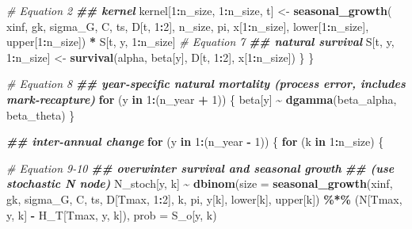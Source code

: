 \documentclass[
]{article}
\newenvironment{Shaded}{\begin{snugshade}}{\end{snugshade}}
\newcommand{\AttributeTok}[1]{\textcolor[rgb]{0.13,0.29,0.53}{#1}}
\newcommand{\CommentTok}[1]{\textcolor[rgb]{0.56,0.35,0.01}{\textit{#1}}}
\newcommand{\ControlFlowTok}[1]{\textcolor[rgb]{0.13,0.29,0.53}{\textbf{#1}}}
\newcommand{\DecValTok}[1]{\textcolor[rgb]{0.00,0.00,0.81}{#1}}
\newcommand{\DocumentationTok}[1]{\textcolor[rgb]{0.56,0.35,0.01}{\textbf{\textit{#1}}}}
\newcommand{\FunctionTok}[1]{\textcolor[rgb]{0.13,0.29,0.53}{\textbf{#1}}}
\newcommand{\NormalTok}[1]{#1}
\newcommand{\OtherTok}[1]{\textcolor[rgb]{0.56,0.35,0.01}{#1}}
\newcommand{\SpecialCharTok}[1]{\textcolor[rgb]{0.81,0.36,0.00}{\textbf{#1}}}
\begin{document}
\begin{Shaded}
\begin{Highlighting}[]
      \CommentTok{\# Equation 2}
      \DocumentationTok{\#\# kernel}
\NormalTok{      kernel[}\DecValTok{1}\SpecialCharTok{:}\NormalTok{n\_size, }\DecValTok{1}\SpecialCharTok{:}\NormalTok{n\_size, t] }\OtherTok{\textless{}{-}} \FunctionTok{seasonal\_growth}\NormalTok{(}
\NormalTok{        xinf, gk, sigma\_G, C, ts, D[t, }\DecValTok{1}\SpecialCharTok{:}\DecValTok{2}\NormalTok{], n\_size, pi, x[}\DecValTok{1}\SpecialCharTok{:}\NormalTok{n\_size], }
\NormalTok{        lower[}\DecValTok{1}\SpecialCharTok{:}\NormalTok{n\_size], upper[}\DecValTok{1}\SpecialCharTok{:}\NormalTok{n\_size]) }\SpecialCharTok{*}\NormalTok{ S[t, y, }\DecValTok{1}\SpecialCharTok{:}\NormalTok{n\_size]}
      \CommentTok{\# Equation 7}
      \DocumentationTok{\#\# natural survival}
\NormalTok{      S[t, y, }\DecValTok{1}\SpecialCharTok{:}\NormalTok{n\_size] }\OtherTok{\textless{}{-}} \FunctionTok{survival}\NormalTok{(alpha, beta[y], D[t, }\DecValTok{1}\SpecialCharTok{:}\DecValTok{2}\NormalTok{], x[}\DecValTok{1}\SpecialCharTok{:}\NormalTok{n\_size])}
\NormalTok{    \}}
\NormalTok{  \}}
  
  \CommentTok{\# Equation 8}
  \DocumentationTok{\#\# year{-}specific natural mortality (process error, includes mark{-}recapture)}
  \ControlFlowTok{for}\NormalTok{ (y }\ControlFlowTok{in} \DecValTok{1}\SpecialCharTok{:}\NormalTok{(n\_year }\SpecialCharTok{+} \DecValTok{1}\NormalTok{)) \{}
\NormalTok{    beta[y] }\SpecialCharTok{\textasciitilde{}} \FunctionTok{dgamma}\NormalTok{(beta\_alpha, beta\_theta)}
\NormalTok{  \}}
  
  \DocumentationTok{\#\# inter{-}annual change}
  \ControlFlowTok{for}\NormalTok{ (y }\ControlFlowTok{in} \DecValTok{1}\SpecialCharTok{:}\NormalTok{(n\_year }\SpecialCharTok{{-}} \DecValTok{1}\NormalTok{)) \{}
    \ControlFlowTok{for}\NormalTok{ (k }\ControlFlowTok{in} \DecValTok{1}\SpecialCharTok{:}\NormalTok{n\_size) \{}
      
      \CommentTok{\# Equation 9{-}10}
      \DocumentationTok{\#\# overwinter survival and seasonal growth}
      \DocumentationTok{\#\# (use stochastic N node)}
\NormalTok{      N\_stoch[y, k] }\SpecialCharTok{\textasciitilde{}} \FunctionTok{dbinom}\NormalTok{(}\AttributeTok{size =} \FunctionTok{seasonal\_growth}\NormalTok{(xinf, gk, sigma\_G, C, ts, }
\NormalTok{                                                    D[Tmax, }\DecValTok{1}\SpecialCharTok{:}\DecValTok{2}\NormalTok{], k, pi, y[k], }
\NormalTok{                                                    lower[k], upper[k]) }\SpecialCharTok{\%*\%} 
\NormalTok{                               (N[Tmax, y, k] }\SpecialCharTok{{-}}\NormalTok{ H\_T[Tmax, y, k]),}
                             \AttributeTok{prob =}\NormalTok{ S\_o[y, k)}
      

\end{Highlighting}
\end{Shaded}
\end{document}
